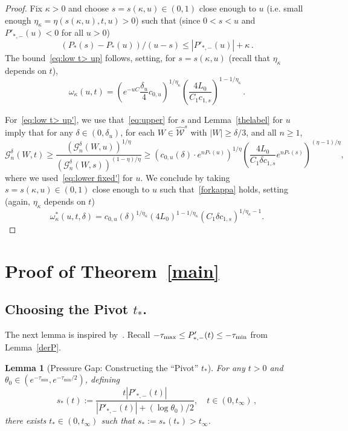 \documentclass[10pt]{amsart}
\newtheorem{lemm}[theo]{Lemma}\newtheorem{prop}[theo]{Proposition}\newtheorem{coro}[theo]{Corollary}\newtheorem{conj}[theo]{Conjecture}
\theoremstyle{definition}\newtheorem{defi}[theo]{Definition}\newtheorem{rema}[theo]{Remark}\newtheorem{exam}[theo]{Example}\newtheorem{exem}[theo]{Example}\newtheorem{nota}[theo]{Notation}
\newcommand{\cG}{\mathcal{G}}
\newcommand{\cW}{\mathcal{W}}
\newcommand{\hW}{\widehat{\cW}}
\begin{document}
\begin{proof}
Fix $\kappa>0$ and choose $s=s(\kappa,u)\in (0, 1)$ close enough to $u$ (i.e. small enough $\eta_\kappa = \eta(s(\kappa, u),t,u) >0$) such that (since $0<s<u$ and $ P'_{*,-}(u)<0$ for all $u>0$)
\begin{equation}\label{forkappa}
\left(P_*(s)-P_*(u)\right)/(u-s) \le \left| P'_{*,-}(u)\right| + \kappa\,.
\end{equation}
The bound~\eqref{eq:low t> up} follows, setting, for $s=s(\kappa,u)$ (recall that $\eta_\kappa$ depends on $t$),
\[
\omega_\kappa(u, t)=\left(e^{- u C} \frac{\delta_{u}}{4} c_{0,u} \right)^{1/{\eta_\kappa}}
\left ({ \frac{ 4 L_0 }{C_1 c_{1,s}} } \right)^{1-1/\eta_\kappa} \,.
\]


For~\eqref{eq:low t> up'}, we use that~\eqref{eq:upper} for $s$ and Lemma~\ref{thelabel} for $u$ imply that for any $\delta\in (0, \delta_{u})$, for each $W \in \hW^s$ with $|W| \ge \delta/3$, and all $n \ge 1$,
\begin{equation}\label{eq:interpol'}
\cG_n^\delta(W,t)
\ge \frac{\left(\cG_n^\delta(W,u)\right)^{1/\eta}}{\left(\cG_n^\delta(W,s)\right)^{(1-\eta)/\eta}}
\ge \left(c_{0,u}(\delta) \cdot e^{nP_*(u) }\right)^{1/\eta}
\left({ \frac{ 4 L_0 }{C_1 \delta c_{1,s}} } e^{nP_*(s)} \right)^{(\eta-1)/\eta},
\end{equation}
where we used~\eqref{eq:lower fixed'} for $u$. We conclude by taking $s=s(\kappa,u) \in (0, 1)$ close enough to $u$ such that~\eqref{forkappa} holds, setting (again, $\eta_\kappa$ depends on $t$)
\begin{equation*}
\omega_\kappa^*(u, t, \delta)=c_{0,u}(\delta)^{1/\eta_\kappa} ({ 4 L_0 })^{1-1/\eta_\kappa}\left(C_1 \delta c_{1,s}\right)^{1/\eta_\kappa-1}.
\end{equation*}
\end{proof}

\section{Proof of Theorem~\ref{main}}\label{44}
\subsection{Choosing the Pivot \texorpdfstring{$t_*$}{t*}.}\label{pivot}


The next lemma is inspired by~\cite[Definition~3.9]{BD2}. Recall $-\tau_{\max}\le P'_{*,-}(t)\linebreak\le -\tau_{\min}$ from Lemma~\ref{derP}.

\begin{lemm}[Pressure Gap: Constructing the ``{Pivot}'' $t_*$]\label{lem:t_*}
For any $t>0$ and $\theta_0\in (e^{- \tau_{\min}},e^{- \tau_{\min}/2})$, defining
\begin{equation}\label{s*}
s_*(t) := \frac{t \left|P'_{*,-}(t)\right|}{\left| P'_{*,-}(t)\right|+ (\log \theta_0)/2}, \quad t\in (0, t_\infty)\,,
\end{equation}
there exists $t_*\in (0,t_\infty)$ such that $s_*:=s_*(t_*)> t_\infty$.
\end{lemm}
\end{document}
